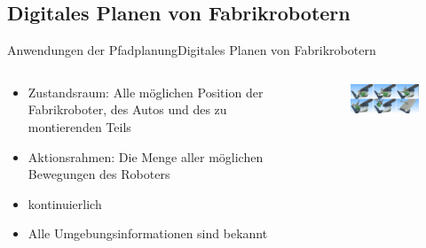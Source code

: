 \documentclass[t,aspectratio=169,dvipsnames]{beamer}
\begin{document}
\subsection{Digitales Planen von Fabrikrobotern}
\begin{frame}{Anwendungen der Pfadplanung}{Digitales Planen von Fabrikrobotern}
	\begin{columns}
		\begin{column}[T]{0.5\textwidth}
			\begin{itemize}
				\item Zustandsraum: Alle möglichen Position der Fabrikroboter, des Autos und des zu montierenden Teils
				\item Aktionsrahmen: Die Menge aller möglichen Bewegungen des Roboters
				\item kontinuierlich
				\item Alle Umgebungsinformationen sind bekannt
			\end{itemize}
		\end{column}
		\begin{column}[T]{0.5\textwidth}
			\begin{figure}
				\includegraphics[width=6.0cm]{images/img231.png}
				\caption{} 
			\end{figure}
		\end{column}
	\end{columns}
\end{frame}
\end{document}
